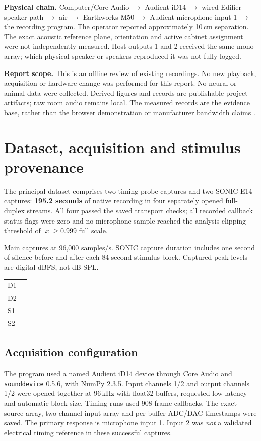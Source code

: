 \documentclass[11pt,letterpaper]{article}
\begin{document}
\textbf{Physical chain.} Computer/Core Audio $\to$ Audient iD14 $\to$ wired Edifier
speaker path $\to$ air $\to$ Earthworks M50 $\to$ Audient microphone input 1 $\to$
the recording program. The operator reported approximately 10\,cm separation.
The exact acoustic reference plane, orientation and active cabinet assignment were
not independently measured. Host outputs 1 and 2 received the same mono array;
which physical speaker or speakers reproduced it was not fully logged.

\textbf{Report scope.} This is an offline review of existing recordings. No new
playback, acquisition or hardware change was performed for this report. No neural
or animal data were collected. Derived figures and records are publishable project
artifacts; raw room audio remains local. The measured records are the evidence
base, rather than the browser demonstration or manufacturer bandwidth claims
\cite{delay,pip,sweep,basic}.

\newpage
\section{Dataset, acquisition and stimulus provenance}
The principal dataset comprises two timing-probe captures and two SONIC E14
captures: \textbf{195.2 seconds} of native recording in four separately opened
full-duplex streams. All four passed the saved transport checks; all recorded
callback status flags were zero and no microphone sample reached the analysis
clipping threshold of $|x|\geq0.999$ full scale.

\begin{table}[H]
\centering\small

\caption{Main captures at 96,000 samples/s. SONIC capture duration includes one second of silence before and after each 84-second stimulus block. Captured peak levels are digital dBFS, not dB SPL.}
\end{table}

\begin{tabularx}{\linewidth}{@{}lY@{}}
D1 & \\
D2 & \\
S1 & \\
S2 & \\
\end{tabularx}

\subsection{Acquisition configuration}
The program used a named Audient iD14 device through Core Audio and
\texttt{sounddevice} 0.5.6, with NumPy 2.3.5. Input channels 1/2 and output
channels 1/2 were opened together at 96\,kHz with float32 buffers, requested low
latency and automatic block size. Timing runs used 908-frame callbacks. The exact
source array, two-channel input array and per-buffer ADC/DAC timestamps were saved.
The primary response is microphone input 1. Input 2 was \emph{not} a validated
electrical timing reference in these successful captures.
\end{document}
